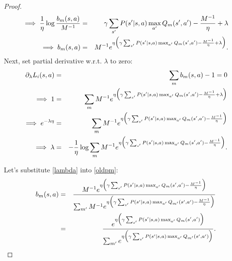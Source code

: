 \begin{theorem}
\begin{proof}
\begin{eqnarray}
		\implies \frac{1}{\eta} \log\frac{ b_m(s,a)}{M^{-1}} & = & \gamma  \sum_{s'}P(s'|s,a)\max_{a'}Q_m(s',a') - \frac{M^{-1}}{\eta} + \lambda \nonumber \\
		\implies b_m(s,a) &= &M^{-1} e^{\eta \Bigr( \gamma  \sum_{s'}P(s'|s,a)\max_{a'}Q_m(s',a') - \frac{M^{-1}}{\eta} + \lambda\Bigl)}\label{oldpm}.
		\end{eqnarray}
		Next, set partial derivative w.r.t. $\lambda$ to zero:
		\begin{eqnarray}
		\partial_{\lambda} L_i(s,a) &=& \sum_{m}b_m(s,a) - 1 = 0 \nonumber \\
		\implies  1 & = & \sum_{m} M^{-1} e^{\eta\Bigr( \gamma  \sum_{s'}P(s'|s,a)\max_{a'}Q_m(s',a') - \frac{M^{-1}}{\eta} + \lambda\Bigl)} \nonumber \\
		\implies e^{-\lambda\eta} & = & \sum_m M^{-1} e^{\eta\Bigr( \gamma  \sum_{s'}P(s'|s,a)\max_{a'}Q_m(s',a') - \frac{M^{-1}}{\eta} \Bigl)} \nonumber \\
		\implies \lambda & = & - \frac{1}{\eta} \log \sum_m M^{-1} e^{\eta\Bigr( \gamma  \sum_{s'}P(s'|s,a)\max_{a'}Q_m(s',a') - \frac{M^{-1}}{\eta} \Bigl)}\label{lambda}. 
		\end{eqnarray}
		
		Let's substitute \eqref{lambda} into \eqref{oldpm}:
		\begin{eqnarray}
		b_m(s,a) &= & \frac{M^{-1}e^{\eta\Bigr( \gamma  \sum_{s'}P(s'|s,a)\max_{a'}Q_m(s',a') - \frac{M^{-1}}{\eta} \Bigl)}}{\sum_{m'} M^{-1} e^{\eta\Bigr( \gamma  \sum_{s'}P(s'|s,a)\max_{a'}Q_{m'}(s',a') - \frac{M^{-1}}{\eta} \Bigl)}}\nonumber \\
		& = & \frac{e^{\eta\Bigr( \gamma  \sum_{s'}P(s'|s,a)\max_{a'}Q_m(s',a') \Bigl)}}{\sum_{m'} e^{\eta\Bigr( \gamma  \sum_{s'}P(s'|s,a)\max_{a'}Q_{m'}(s',a') \Bigl)}}\nonumber.
		\end{eqnarray}
		

\end{proof}
\end{theorem}
